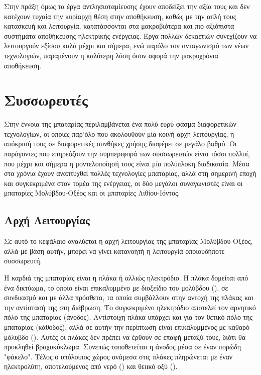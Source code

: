 \documentclass[12pt]{report}
\begin{document}
Στην πράξη όμως τα έργα αντλησιοταμίευσης έχουν αποδείξει την αξία τους και δεν κατέχουν τυχαία την κυρίαρχη θέση στην αποθήκευση, καθώς με την απλή τους κατασκευή και λειτουργία, 
κατατάσσονται στα μακροβιότερα και πιο αξιόπιστα συστήματα αποθήκευσης ηλεκτρικής ενέργειας. Έργα πολλών δεκαετιών συνεχίζουν να λειτουργούν εξίσου καλά μέχρι και σήμερα, ενώ παρόλο τον ανταγωνισμό των νέων τεχνολογιών,
παραμένουν η καλύτερη λύση όσον αφορά την μακρυχρόνια αποθήκευση.
\section{Συσσωρευτές}
Στην έννοια της μπαταρίας περιλαμβάνεται ένα πολύ ευρύ φάσμα διαφορετικών τεχνολογίων, οι οποίες παρ'όλο που ακολουθούν μία κοινή αρχή λειτουργίας, η απόκρισή τους σε διαφορετικές συνθήκες χρήσης διαφέρει σε μεγάλο βαθμό. 
Οι παράγοντες που επηρεάζουν την συμπεριφορά των συσσωρευτών είναι τόσοι πολλοί, που μέχρι και σήμερα η μοντελοποίησή τους είναι μία πολύπλοκη διαδικασία. Μέσα στα χρόνια έχουν αναπτυχθεί πολλές τεχνολογίες μπαταρίας, 
αλλά στη σημερινή εποχή και συγκεκριμένα στον τομέα της ενέργειας, οι δύο μεγάλοι συναγωνιστές είναι οι μπαταρίες Μολύβδου-Οξέος και οι μπαταρίες Λιθίου-Ιόντος.
\subsection{Αρχή Λειτουργίας}
Σε αυτό το κεφάλαιο αναλύεται η αρχή λειτουργίας της μπαταρίας Μολύβδου-Οξέος, αλλά με βάση αυτήν, μπορεί να γίνει κατανοητή η λειτουργία οποιουδήποτε συσσωρευτή. 

Η καρδιά της μπαταρίας είναι η πλάκα ή αλλιώς ηλεκτρόδιο.
Η πλάκα δομείται από ένα δικτύωμα, το οποίο είναι επικαλυμμένο με διοξείδιο του μολύβδου ({}), σε συνδυασμό και με άλλα πρόσθετα, τα οποία συμβάλλουν στην αντοχή της πλάκας και την αντίστασή της στη διάβρωση. 
Το συγκεκριμένο ηλεκτρόδιο αποτελεί τον αρνητικό πόλο της μπαταρίας (άνοδος). Αντίστοιχη πλάκα υπάρχει και για τον θετικό πόλο της μπαταρίας (κάθοδος), 
αλλά σε αυτήν την περίπτωση είναι επικαλυμμένος με καθαρό μόλυβδο ({}). Αυτές οι πλάκες δεν πρέπει να 
έρθουν σε επαφή μεταξύ τους, διότι θα προκληθεί βραχυκύκλωμα. Συνεπώς τοποθετείται η άνοδος μέσα σε έναν πορώδη "φάκελο". 
Τέλος ο υπόλοιπος χώρος ανάμεσα στις πλάκες πληρώνεται με έναν ηλεκτρολύτη, αποτελούμενος από νερό ({}) και θειικό οξύ ({}).
\end{document}
